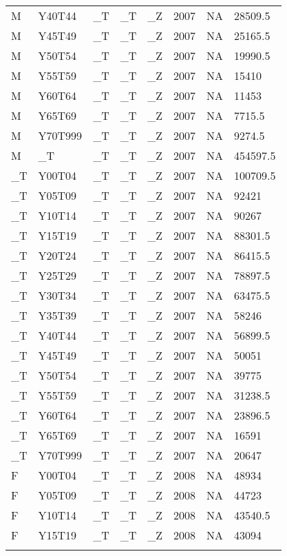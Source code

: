 \begin{longtable}[t]{llllllll}
M & Y40T44 & \_T & \_T & \_Z & 2007 & NA & 28509.5\\
M & Y45T49 & \_T & \_T & \_Z & 2007 & NA & 25165.5\\
\addlinespace
M & Y50T54 & \_T & \_T & \_Z & 2007 & NA & 19990.5\\
M & Y55T59 & \_T & \_T & \_Z & 2007 & NA & 15410\\
M & Y60T64 & \_T & \_T & \_Z & 2007 & NA & 11453\\
M & Y65T69 & \_T & \_T & \_Z & 2007 & NA & 7715.5\\
M & Y70T999 & \_T & \_T & \_Z & 2007 & NA & 9274.5\\
\addlinespace
M & \_T & \_T & \_T & \_Z & 2007 & NA & 454597.5\\
\_T & Y00T04 & \_T & \_T & \_Z & 2007 & NA & 100709.5\\
\_T & Y05T09 & \_T & \_T & \_Z & 2007 & NA & 92421\\
\_T & Y10T14 & \_T & \_T & \_Z & 2007 & NA & 90267\\
\_T & Y15T19 & \_T & \_T & \_Z & 2007 & NA & 88301.5\\
\addlinespace
\_T & Y20T24 & \_T & \_T & \_Z & 2007 & NA & 86415.5\\
\_T & Y25T29 & \_T & \_T & \_Z & 2007 & NA & 78897.5\\
\_T & Y30T34 & \_T & \_T & \_Z & 2007 & NA & 63475.5\\
\_T & Y35T39 & \_T & \_T & \_Z & 2007 & NA & 58246\\
\_T & Y40T44 & \_T & \_T & \_Z & 2007 & NA & 56899.5\\
\addlinespace
\_T & Y45T49 & \_T & \_T & \_Z & 2007 & NA & 50051\\
\_T & Y50T54 & \_T & \_T & \_Z & 2007 & NA & 39775\\
\_T & Y55T59 & \_T & \_T & \_Z & 2007 & NA & 31238.5\\
\_T & Y60T64 & \_T & \_T & \_Z & 2007 & NA & 23896.5\\
\_T & Y65T69 & \_T & \_T & \_Z & 2007 & NA & 16591\\
\addlinespace
\_T & Y70T999 & \_T & \_T & \_Z & 2007 & NA & 20647\\
F & Y00T04 & \_T & \_T & \_Z & 2008 & NA & 48934\\
F & Y05T09 & \_T & \_T & \_Z & 2008 & NA & 44723\\
F & Y10T14 & \_T & \_T & \_Z & 2008 & NA & 43540.5\\
F & Y15T19 & \_T & \_T & \_Z & 2008 & NA & 43094\\
\addlinespace

\end{longtable}
